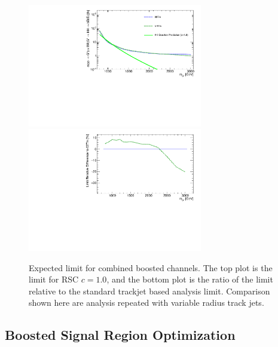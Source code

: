 \begin{figure}[htbp!]
\begin{center}
\includegraphics[angle=270, width=0.68\textwidth]{./figures/boosted/AppendixOptimization/CompareLimits_HH_BoostedNewRun2-vr_c10.pdf}\\
\includegraphics[angle=270, width=0.68\textwidth]{./figures/boosted/AppendixOptimization/CompareLimits_HH_BoostedNewRun2-vr_c10_ratio.pdf}
  \caption{Expected limit for combined boosted channels. The top plot is the limit for RSC $c=1.0$, and the bottom plot is the ratio of the limit relative to the standard trackjet based analysis limit. Comparison shown here are analysis repeated with variable radius track jets.}
  \label{fig:app-optimization-vr}
\end{center}
\end{figure}

\clearpage
\subsection{Boosted Signal Region Optimization}
\label{sec:app-optimization-sr}
